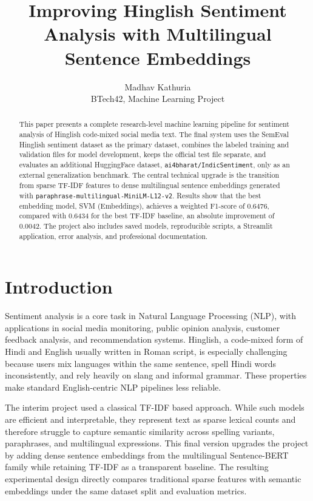 \documentclass[11pt,a4paper]{article}
\title{Improving Hinglish Sentiment Analysis with Multilingual Sentence Embeddings}
\author{Madhav Kathuria\\BTech42, Machine Learning Project}
\date{}
\begin{document}
\maketitle

\begin{abstract}
This paper presents a complete research-level machine learning pipeline for sentiment analysis of Hinglish code-mixed social media text. The final system uses the SemEval Hinglish sentiment dataset as the primary dataset, combines the labeled training and validation files for model development, keeps the official test file separate, and evaluates an additional HuggingFace dataset, \texttt{ai4bharat/IndicSentiment}, only as an external generalization benchmark. The central technical upgrade is the transition from sparse TF-IDF features to dense multilingual sentence embeddings generated with \texttt{paraphrase-multilingual-MiniLM-L12-v2}. Results show that the best embedding model, SVM (Embeddings), achieves a weighted F1-score of 0.6476, compared with 0.6434 for the best TF-IDF baseline, an absolute improvement of 0.0042. The project also includes saved models, reproducible scripts, a Streamlit application, error analysis, and professional documentation.
\end{abstract}

\section{Introduction}
Sentiment analysis is a core task in Natural Language Processing (NLP), with applications in social media monitoring, public opinion analysis, customer feedback analysis, and recommendation systems. Hinglish, a code-mixed form of Hindi and English usually written in Roman script, is especially challenging because users mix languages within the same sentence, spell Hindi words inconsistently, and rely heavily on slang and informal grammar. These properties make standard English-centric NLP pipelines less reliable.

The interim project used a classical TF-IDF based approach. While such models are efficient and interpretable, they represent text as sparse lexical counts and therefore struggle to capture semantic similarity across spelling variants, paraphrases, and multilingual expressions. This final version upgrades the project by adding dense sentence embeddings from the multilingual Sentence-BERT family while retaining TF-IDF as a transparent baseline. The resulting experimental design directly compares traditional sparse features with semantic embeddings under the same dataset split and evaluation metrics.
\end{document}
